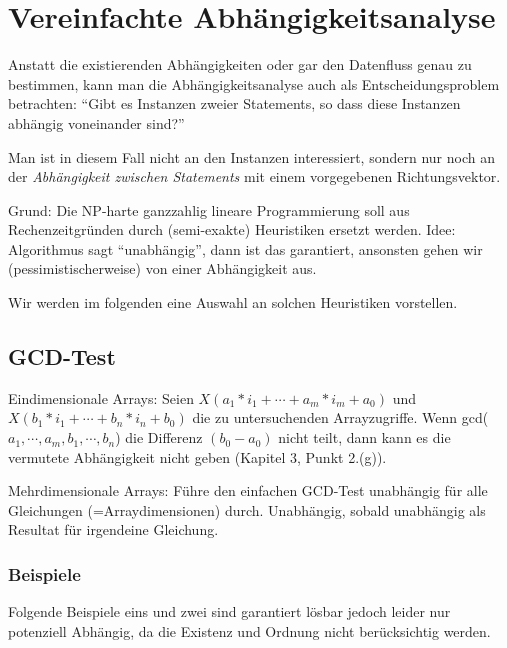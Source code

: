 \section{Vereinfachte Abhängigkeitsanalyse}

Anstatt die existierenden Abhängigkeiten oder gar den Datenfluss genau
zu bestimmen, kann man die Abhängigkeitsanalyse auch als
Entscheidungsproblem betrachten: ``Gibt es Instanzen zweier
Statements, so dass diese Instanzen abhängig voneinander sind?''

Man ist in diesem Fall nicht an den Instanzen interessiert, sondern
nur noch an der \emph{Abhängigkeit zwischen Statements} mit einem
vorgegebenen Richtungsvektor.

Grund: Die NP-harte ganzzahlig lineare Programmierung soll aus
Rechenzeitgründen durch (semi-exakte) Heuristiken ersetzt werden.
Idee: Algorithmus sagt ``unabhängig'', dann ist das garantiert,
ansonsten gehen wir (pessimistischerweise) von einer Abhängigkeit aus.

Wir werden im folgenden eine Auswahl an solchen Heuristiken
vorstellen.


\subsection{GCD-Test \cite{Ban93}}
Eindimensionale Arrays: Seien $X(a_1*i_1+\cdots+a_m*i_m+a_0)$ und
$X(b_1*i_1+\cdots+b_n*i_n+b_0)$ die zu untersuchenden Arrayzugriffe.
Wenn gcd($a_1,\cdots,a_m,b_1,\cdots,b_n$) die Differenz $(b_0-a_0)$
nicht teilt, dann kann es die vermutete Abhängigkeit nicht geben
(Kapitel 3, Punkt 2.(g)).

\smallskip

Mehrdimensionale Arrays: Führe den einfachen GCD-Test unabhängig für
alle Gleichungen (=Arraydimensionen) durch. Unabhängig, sobald
unabhängig als Resultat für irgendeine Gleichung.

\subsubsection{Beispiele}

Folgende Beispiele eins und zwei sind garantiert lösbar jedoch leider nur potenziell Abhängig, da die Existenz und Ordnung nicht berücksichtig werden.


